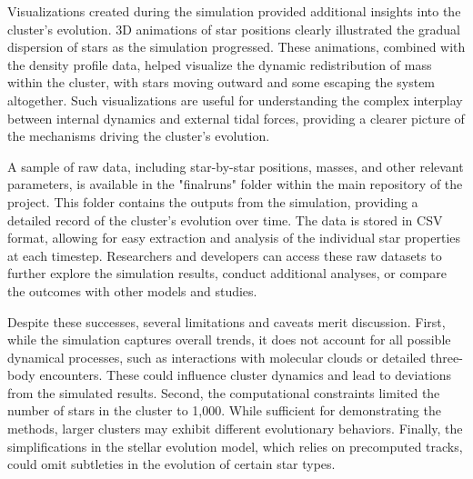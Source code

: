 \documentclass[10pt,twocolumn]{article}
\begin{document}
Visualizations created during the simulation provided additional insights into the cluster’s evolution. 3D animations of star positions clearly illustrated the gradual dispersion of stars as the simulation progressed. These animations, combined with the density profile data, helped visualize the dynamic redistribution of mass within the cluster, with stars moving outward and some escaping the system altogether. Such visualizations are useful for understanding the complex interplay between internal dynamics and external tidal forces, providing a clearer picture of the mechanisms driving the cluster's evolution.

A sample of raw data, including star-by-star positions, masses, and other relevant parameters, is available in the "finalruns" folder within the main repository of the project. This folder contains the outputs from the simulation, providing a detailed record of the cluster's evolution over time. The data is stored in CSV format, allowing for easy extraction and analysis of the individual star properties at each timestep. Researchers and developers can access these raw datasets to further explore the simulation results, conduct additional analyses, or compare the outcomes with other models and studies.

Despite these successes, several limitations and caveats merit discussion. First, while the simulation captures overall trends, it does not account for all possible dynamical processes, such as interactions with molecular clouds or detailed three-body encounters. These could influence cluster dynamics and lead to deviations from the simulated results. Second, the computational constraints limited the number of stars in the cluster to 1,000. While sufficient for demonstrating the methods, larger clusters may exhibit different evolutionary behaviors. Finally, the simplifications in the stellar evolution model, which relies on precomputed tracks, could omit subtleties in the evolution of certain star types.
\end{document}
